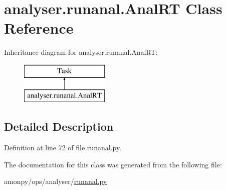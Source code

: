 \hypertarget{classanalyser_1_1runanal_1_1_anal_r_t}{\section{analyser.\-runanal.\-Anal\-R\-T Class Reference}
\label{classanalyser_1_1runanal_1_1_anal_r_t}
}
Inheritance diagram for analyser.\-runanal.\-Anal\-R\-T\-:\begin{figure}[H]
\begin{center}
\leavevmode
\includegraphics[height=2.000000cm]{d7/dd8/classanalyser_1_1runanal_1_1_anal_r_t}
\end{center}
\end{figure}


\subsection{Detailed Description}


Definition at line 72 of file runanal.\-py.



The documentation for this class was generated from the following file\-:\begin{DoxyCompactItemize}
\item 
amonpy/ops/analyser/\hyperlink{runanal_8py}{runanal.\-py}\end{DoxyCompactItemize}
